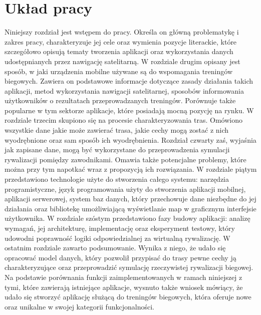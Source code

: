 \section{Układ pracy}
Niniejszy rozdział jest wstępem do pracy. Określa on główną problematykę i zakres pracy, charakteryzuje jej cele oraz wymienia pozycje literackie, które szczegółowo opisują tematy tworzenia aplikacji oraz wykorzystania danych udostępnianych przez nawigację satelitarną. W rozdziale drugim opisany jest sposób, w jaki urządzenia mobilne używane są do wspomagania treningów biegowych. Zawiera on podstawowe informacje dotyczące zasady działania takich aplikacji, metod wykorzystania nawigacji satelitarnej, sposobów informowania użytkowników o rezultatach przeprowadzanych treningów. Porównuje także popularne w tym sektorze aplikacje, które posiadają mocną pozycję na rynku. W rozdziale trzecim skupiono się na procesie charakteryzowania tras. Omówiono wszystkie dane jakie może zawierać trasa, jakie cechy mogą zostać z nich wyodrębnione oraz sam sposób ich wyodrębnienia. Rozdział czwarty zaś, wyjaśnia jak zapisane dane, mogą być wykorzystane do przeprowadzenia symulacji rywalizacji pomiędzy zawodnikami. Omawia także potencjalne problemy, które można przy tym napotkać wraz z propozycją ich rozwiązania. W rozdziale piątym przedstawiono technologie użyte do stworzenia całego systemu: narzędzia programistyczne, język programowania użyty do stworzenia aplikacji mobilnej, aplikacji serwerowej, system baz danych, który przechowuje dane niezbędne do jej działania oraz bibliotekę umożliwiającą wyświetlanie map w graficznym interfejsie użytkownika. W rozdziale szóstym przedstawiono fazy budowy aplikacji: analizę wymagań, jej architekturę, implementację oraz eksperyment testowy, który udowodni poprawność logiki odpowiedzialnej za wirtualną rywalizację. W ostatnim rozdziale zawarto podsumowanie. Wynika z niego, że udało się opracować model danych, który pozwolił przypisać do trasy pewne cechy ją charakteryzujące oraz przeprowadzić symulację rzeczywistej rywalizacji biegowej. Na podstawie porównania funkcji zaimplementowanych w ramach niniejszej z tymi, które zawierają istniejące aplikacje, wysnuto także wniosek mówiący, że udało się stworzyć aplikację służącą do treningów biegowych, która oferuje nowe oraz unikalne w swojej kategorii funkcjonalności.
